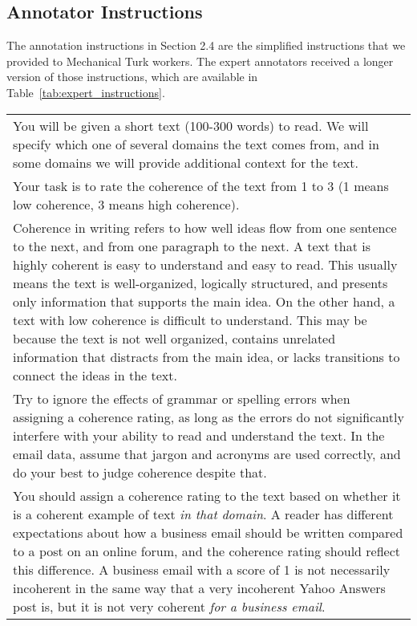 \documentclass[11pt,a4paper]{article}
\begin{document}
\subsection{Annotator Instructions}

The annotation instructions in Section 2.4 are the simplified instructions that we provided to Mechanical Turk workers. The expert annotators received a longer version of those instructions, which are available in Table~\ref{tab:expert_instructions}.

\begin{table*}
\centering
\begin{small}
\begin{tabular}{@{}p{16cm}@{}}	
You will be given a short text (100-300 words) to read. We will specify which one of several domains the text comes from, and in some domains we will provide additional context for the text.\\[4pt]

Your task is to rate the coherence of the text from 1 to 3 (1 means low coherence, 3 means high coherence).\\[4pt]

Coherence in writing refers to how well ideas flow from one sentence to the next, and from one paragraph to the next. A text that is highly coherent is easy to understand and easy to read. This usually means the text is well-organized, logically structured, and presents only information that supports the main idea. On the other hand, a text with low coherence is difficult to understand. This may be because the text is not well organized, contains unrelated information that distracts from the main idea, or lacks transitions to connect the ideas in the text.\\[4pt]

Try to ignore the effects of grammar or spelling errors when assigning a coherence rating, as long as the errors do not significantly interfere with your ability to read and understand the text. In the email data, assume that jargon and acronyms are used correctly, and do your best to judge coherence despite that.\\[4pt]

You should assign a coherence rating to the text based on whether it is a coherent example of text \textit{in that domain}. A reader has different expectations about how a business email should be written compared to a post on an online forum, and the coherence rating should reflect this difference. A business email with a score of 1 is not necessarily incoherent in the same way that a very incoherent Yahoo Answers post is, but it is not very coherent \textit{for a business email}. 
\end{tabular}
\end{small}
\caption{The annotation instructions we provided to expert annotators.}
\label{tab:expert_instructions}
\end{table*}
\end{document}
